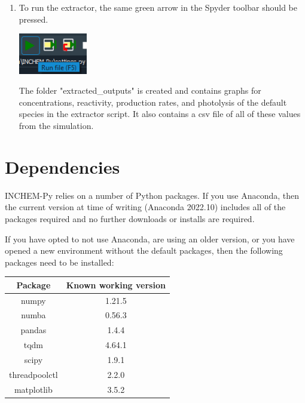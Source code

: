 \documentclass[a4paper]{refart}
\begin{document}
{\begin{minipage}{\fullwidth}
\begin{enumerate}
    \item To run the extractor, the same green arrow in the Spyder toolbar should be pressed.
                
            \vspace{1em}
            \begin{minipage}[t]{\linewidth}
                \centering
                \includegraphics[width = 3cm]{run.png}
            \end{minipage}
          
          The folder "extracted\_outputs" is created and contains graphs for concentrations, reactivity, production rates, and photolysis of the default species in the extractor script. It also contains a csv file of all of these values from the simulation.
\end{enumerate}
\end{minipage}}

\newpage
\section{Dependencies}


INCHEM-Py relies on a number of Python packages. If you use Anaconda, then the current version at time of writing (Anaconda 2022.10) includes all of the packages required and no further downloads or installs are required.

If you have opted to not use Anaconda, are using an older version, or you have opened a new environment without the default packages, then the following packages need to be installed:
\begin{table}[h!]
    \centering
    \begin{tabular}{c|c}
        Package & Known working version \\
        \hline
        numpy & 1.21.5 \\
        numba & 0.56.3 \\
        pandas & 1.4.4 \\
        tqdm & 4.64.1 \\
        scipy & 1.9.1 \\
        threadpoolctl & 2.2.0 \\
        matplotlib & 3.5.2 \\
    \end{tabular}
\end{table}
\end{document}

